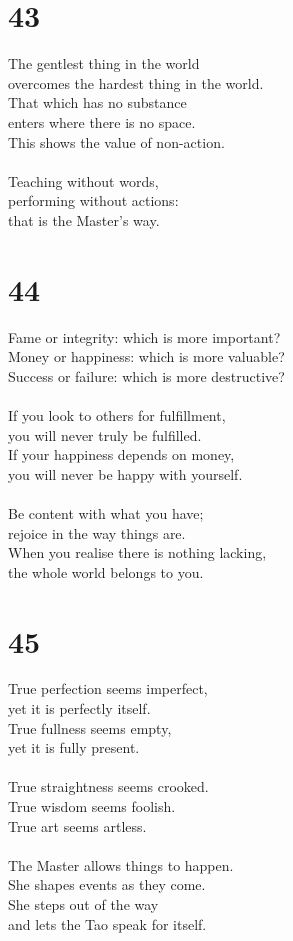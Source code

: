\documentclass[b5paper, 12pt, oneside]{book}
\begin{document}
\chapter*{43}
The gentlest thing in the world\\
overcomes the hardest thing in the world.\\
That which has no substance\\
enters where there is no space.\\
This shows the value of non-action.\\
\\
Teaching without words,\\
performing without actions:\\
that is the Master's way.\\

\chapter*{44}
Fame or integrity: which is more important?\\
Money or happiness: which is more valuable?\\
Success or failure: which is more destructive?\\
\\
If you look to others for fulfillment,\\
you will never truly be fulfilled.\\
If your happiness depends on money,\\
you will never be happy with yourself.\\
\\
Be content with what you have;\\
rejoice in the way things are.\\
When you realise there is nothing lacking,\\
the whole world belongs to you.\\

\chapter*{45}
True perfection seems imperfect,\\
yet it is perfectly itself.\\
True fullness seems empty,\\
yet it is fully present.\\
\\
True straightness seems crooked.\\
True wisdom seems foolish.\\
True art seems artless.\\
\\
The Master allows things to happen.\\
She shapes events as they come.\\
She steps out of the way\\
and lets the Tao speak for itself.\\
\end{document}
